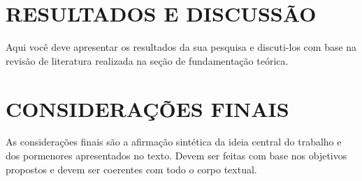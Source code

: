 \section{RESULTADOS E DISCUSSÃO}
\label{sec:resultados}

Aqui você deve apresentar os resultados da sua pesquisa e discuti-los com base na revisão de literatura realizada na seção de fundamentação teórica.

\section{CONSIDERAÇÕES FINAIS}
\label{sec:consideracoes-finais}

As considerações finais são a afirmação sintética da ideia central do trabalho e dos pormenores apresentados no texto.
Devem ser feitas com base nos objetivos propostos e devem ser coerentes com todo o corpo textual.





